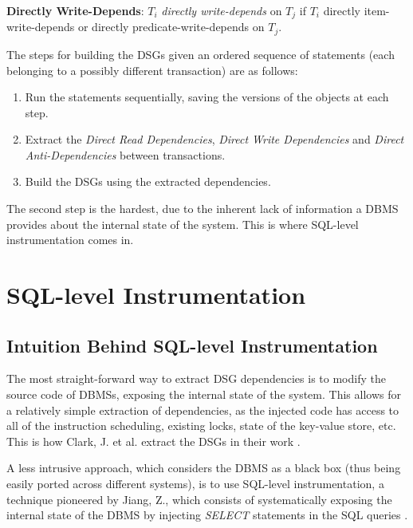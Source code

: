 \begin{definition}
    \textbf{Directly Write-Depends}: $T_i$ \textit{directly write-depends} on $T_j$ if $T_i$ directly item-write-depends or directly predicate-write-depends on $T_j$.
\end{definition}

The steps for building the DSGs given an ordered sequence of statements (each belonging to a possibly different transaction) are as follows:
\begin{enumerate}
    \item Run the statements sequentially, saving the versions of the objects at each step.
    \item Extract the \textit{Direct Read Dependencies}, \textit{Direct Write Dependencies} and \textit{Direct Anti-Dependencies} between transactions.
    \item Build the DSGs using the extracted dependencies.
\end{enumerate}

The second step is the hardest, due to the inherent lack of information a DBMS provides about the internal state of the system. This is where SQL-level instrumentation comes in.

\section{SQL-level Instrumentation}

\subsection{Intuition Behind SQL-level Instrumentation}

The most straight-forward way to extract DSG dependencies is to modify the source code of DBMSs, exposing the internal state of the system. This allows for a relatively simple extraction of dependencies, as the injected code has access to all of the instruction scheduling, existing locks, state of the key-value store, etc. This is how Clark, J. et al. extract the DSGs in their work \cite{clark2024validating}.

A less intrusive approach, which considers the DBMS as a black box (thus being easily ported across different systems), is to use SQL-level instrumentation, a technique pioneered by Jiang, Z., which consists of systematically exposing the internal state of the DBMS by injecting \textit{SELECT} statements in the SQL queries \cite{jiang2023detecting}.

